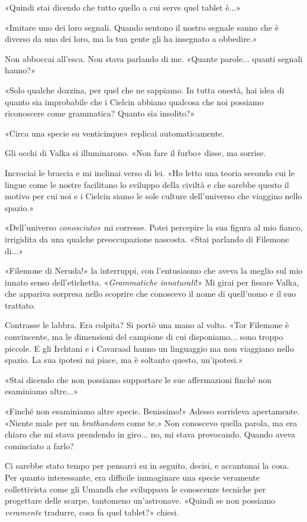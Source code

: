 «Quindi stai dicendo che tutto quello a cui serve quel tablet è...»

«Imitare uno dei loro segnali. Quando sentono il nostro segnale sanno
che è diverso da uno dei loro, ma la tua gente gli ha insegnato a
obbedire.»

Non abboccai all'esca. Non stava parlando di me. «Quante parole...
quanti segnali hanno?»

«Solo qualche dozzina, per quel che ne sappiamo. In tutta onestà, hai
idea di quanto sia improbabile che i Cielcin abbiano qualcosa che noi
possiamo riconoscere come grammatica? Quanto sia insolito?»

«Circa una specie su venticinque» replicai automaticamente.

Gli occhi di Valka si illuminarono. «Non fare il furbo» disse, ma
sorrise.

Incrociai le braccia e mi inclinai verso di lei. «Ho letto una teoria
secondo cui le lingue come le nostre facilitano lo sviluppo della
civiltà e che sarebbe questo il motivo per cui noi e i Cielcin siamo le
sole culture dell'universo che viaggino nello spazio.»

«Dell'universo \emph{conosciuto}» mi corresse. Potei percepire la sua
figura al mio fianco, irrigidita da una qualche preoccupazione nascosta.
«Stai parlando di Filemone di...»

«Filemone di Neruda!» la interruppi, con l'entusiasmo che aveva la
meglio sul mio innato senso dell'etichetta. «\emph{Grammatiche
	innaturali}!» Mi girai per fissare Valka, che appariva sorpresa nello
scoprire che conoscevo il nome di quell'uomo e il suo trattato.

Contrasse le labbra. Era colpita? Si portò una mano al volto. «Tor
Filemone è convincente, ma le dimensioni del campione di cui
disponiamo... sono troppo piccole. E gli Irchtani e i Cavaraad hanno un
linguaggio ma non viaggiano nello spazio. La sua ipotesi mi piace, ma è
soltanto questo, un'ipotesi.»

«Stai dicendo che non possiamo supportare le sue affermazioni finché non
esaminiamo altre...»

«Finché non esaminiamo altre specie. Benissimo!» Adesso sorrideva
apertamente. «Niente male per un \emph{brathandom} come te.» Non
conoscevo quella parola, ma era chiaro che mi stava prendendo in giro...
no, mi stava provocando. Quando aveva cominciato a farlo?

Ci sarebbe stato tempo per pensarci su in seguito, decisi, e accantonai
la cosa. Per quanto interessante, era difficile immaginare una specie
veramente collettivista come gli Umandh che sviluppava le conoscenze
tecniche per progettare delle scarpe, tantomeno un'astronave. «Quindi se
non possiamo \emph{veramente} tradurre, cosa fa quel tablet?» chiesi.

